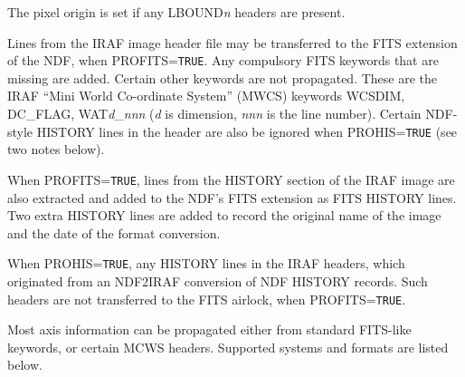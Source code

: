\documentclass[twoside,11pt]{starlink}
\begin{document}
{{{         \sstitem
         The pixel origin is set if any LBOUND\textit{n} headers are present.

         \sstitem
         Lines from the IRAF image header file may be transferred to
         the FITS extension of the NDF, when PROFITS=\texttt{TRUE}.  Any
         compulsory FITS keywords that are missing are added.  Certain
         other keywords are not propagated.  These are the IRAF ``Mini
         World Co-ordinate System'' (MWCS) keywords WCSDIM, DC\_FLAG,
         WAT\textit{d}\_\textit{nnn} (\textit{d} is dimension, \textit{nnn}
         is the line number).
         Certain NDF-style HISTORY lines in the header are also
         be ignored when PROHIS=\texttt{TRUE} (see two notes below).

         \sstitem
         When PROFITS=\texttt{TRUE}, lines from the HISTORY section of the IRAF
         image are also extracted and added to the NDF's FITS extension as
         FITS HISTORY lines.  Two extra HISTORY lines are added to record
         the original name of the image and the date of the format
         conversion.

         \sstitem
         When PROHIS=\texttt{TRUE}, any HISTORY lines in the IRAF headers, which
         originated from an NDF2IRAF conversion of NDF HISTORY records.
         Such headers are not transferred to the FITS airlock, when
         PROFITS=\texttt{TRUE}.

         \sstitem
         Most axis information can be propagated either from standard
         FITS-like keywords, or certain MCWS headers.  Supported systems
         and formats are listed below.
         }}}
\end{document}
